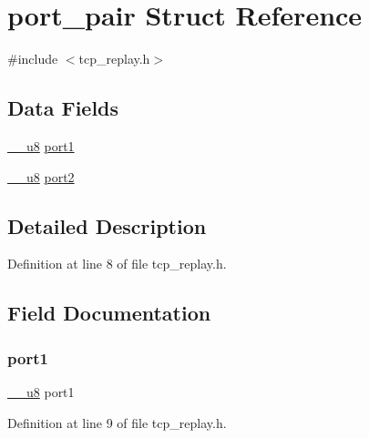 \hypertarget{structport__pair}{}\section{port\+\_\+pair Struct Reference}
\label{structport__pair}


{\ttfamily \#include $<$tcp\+\_\+replay.\+h$>$}

\subsection*{Data Fields}
\begin{DoxyCompactItemize}
\item 
\hyperlink{asm__types_8h_a77f8102529baef48621b98012524115d}{\+\_\+\+\_\+u8} \hyperlink{structport__pair_a26a2e7a4824d822361b1357a628f7953}{port1}
\item 
\hyperlink{asm__types_8h_a77f8102529baef48621b98012524115d}{\+\_\+\+\_\+u8} \hyperlink{structport__pair_a979816a50673ef076d5ef40e89c6b3f2}{port2}
\end{DoxyCompactItemize}


\subsection{Detailed Description}


Definition at line 8 of file tcp\+\_\+replay.\+h.



\subsection{Field Documentation}
\mbox{\label{structport__pair_a26a2e7a4824d822361b1357a628f7953}} 
\subsubsection{\texorpdfstring{port1}{port1}}
{\footnotesize\ttfamily \hyperlink{asm__types_8h_a77f8102529baef48621b98012524115d}{\+\_\+\+\_\+u8} port1}



Definition at line 9 of file tcp\+\_\+replay.\+h.

\mbox{\label{structport__pair_a979816a50673ef076d5ef40e89c6b3f2}} 
